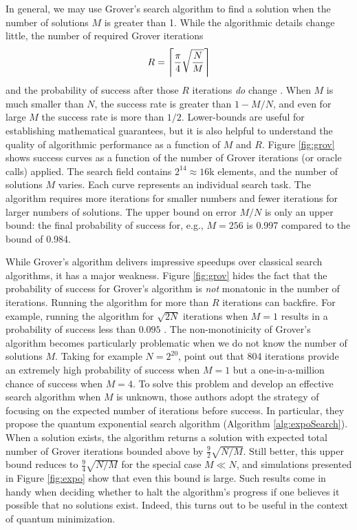 \documentclass[12pt]{article} %
\DeclarePairedDelimiter{\ceil}{\lceil}{\rceil}
\begin{document}
In general, we may use Grover's search algorithm to find a solution when the number of solutions $M$ is greater than 1. While the algorithmic details change little, the number of required Grover iterations
\begin{align}\label{eq:R}
R = \ceil[\Bigg]{\frac{\pi}{4} \sqrt{\frac{N}{M}}}
\end{align}
 and the probability of success after those $R$ iterations \emph{do} change \citep{boyer1998tight}.  When $M$ is much smaller than $N$, the success rate is greater than $1-M/N$, and even for large $M$ the success rate is more than $1/2$. Lower-bounds are useful for establishing mathematical guarantees, but it is also helpful to understand the quality of algorithmic performance as a function of $M$ and $R$. Figure \ref{fig:grov} shows success curves as a function of the number of Grover iterations (or oracle calls) applied.  The search field contains $2^{14} \approx 16$k elements, and the number of solutions $M$ varies. Each curve represents an individual search task.  The algorithm requires more iterations for smaller numbers and fewer iterations for larger numbers of solutions.  The upper bound on error $M/N$ is only an upper bound: the final probability of success for, e.g., $M=256$ is 0.997 compared to the bound of 0.984.
 

 
 While Grover's algorithm delivers impressive speedups over classical search algorithms, it has a major weakness.
 Figure \ref{fig:grov} hides the fact that the probability of success for Grover's algorithm is \emph{not} monatonic in the number of iterations.  Running the algorithm for more than $R$ iterations can backfire.  For example, running the algorithm for $\sqrt{2N}$ iterations when $M=1$ results in a probability of success less than $0.095$ \citep{boyer1998tight}.  The non-monotinicity of Grover's algorithm becomes particularly problematic when we do not know the number of solutions $M$. Taking for example $N=2^{20}$, \citet{boyer1998tight} point out that 804 iterations provide an extremely high probability of success when $M=1$ but a one-in-a-million chance of success when $M=4$.  To solve this problem and develop an effective search algorithm when $M$ is unknown, those authors adopt the strategy of focusing on the expected number of iterations before success. In particular, they propose the quantum exponential search algorithm (Algorithm \ref{alg:expoSearch}).  When a solution exists, the algorithm returns a solution with expected total number of Grover iterations bounded above by $\frac{9}{2}\sqrt{N/M}$.  Still better, this upper bound reduces to $\frac{9}{4}\sqrt{N/M}$ for the special case $M\ll N$, and simulations presented in Figure \ref{fig:expo} show that even this bound is large.  Such results come in handy when deciding whether to halt the algorithm's progress if one believes it possible that no solutions exist.  Indeed, this turns out to be useful in the context of quantum minimization.
 
\end{document}
